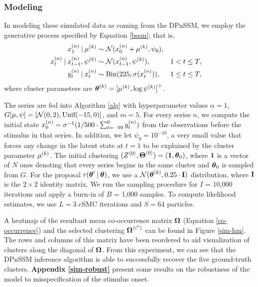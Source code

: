 \documentclass[twoside]{article}
\begin{document}
\subsubsection{Modeling} \label{sim-model-details}
In modeling these simulated data as coming from the DPnSSM, we employ the generative process specified by Equation \ref{bssm}; that is,
\begin{align} \label{sim-model}
\idx[1] x n \given \idx \mu k &\sim \Norm(\idx[0] x n + \idx \mu k, \psi_0),  \\ \nonumber
\idx[t] x n \given \idx[t-1] x n, \idx \psi k &\sim \Norm(\idx[t-1] x n, \idx \psi k), & & 1 < t \leq T, \\ \nonumber
\idx[t] y n \given \idx[t] x n &\sim \text{Bin}(225, \sigma(\idx[t] x n)), & & 1 \leq t \leq T, 
\end{align} 
where cluster parameters are $\bidx \theta k = [\idx \mu k, \log \idx \psi k]^\top$.  
 
The series are fed into Algorithm \ref{alg} with hyperparameter values $\alpha = 1$, $G[\mu, \psi] = [\Norm(0, 2), \text{Unif}(-15, 0)]$, and $m = 5$.  For every series $n$, we compute the initial state $\idx[0] x n = \sigma^{-1}(1 / 500 \cdot \sum_{t=-99}^{0} \idx[t] y n)$ from the observations before the stimulus in that series.  In addition, we let $\psi_0 = 10^{-10}$, a very small value that forces any change in the latent state at $t = 1$ to be explained by the cluster parameter $\idx \mu k$.  The initial clustering $(\aidx Z 0, \baidx \Theta 0) = (\bd 1, \bd \theta_0)$, where $\bd 1$ is a vector of $N$ ones denoting that every series begins in the same cluster and $\bd \theta_0$ is sampled from $G$.  For the proposal $r(\bd \theta' \given \bd \theta)$, we use a $\Norm(\bidx \theta k,  0.25 \cdot {\bold I})$ distribution, where $\bold I$ is the $2 \times 2$ identity matrix.  We run the sampling procedure for $I$ = 10,000 iterations and apply a burn-in of $B$ = 1,000 samples. To compute likelihood estimates, we use $L = 3$ cSMC iterations and $S = 64$ particles.  

A heatmap of the resultant mean co-occurrence matrix $\bd \Omega$ (Equation \ref{co-occurrence}) and the selected clustering $\baidx \Omega {i^*}$ can be found in Figure \ref{sim-hm}.  The rows and columns of this matrix have been reordered to aid visualization of clusters along the diagonal of $\bd \Omega$.  From this experiment, we can see that the DPnSSM inference algorithm is able to successfully recover the five ground-truth clusters.  \textbf{Appendix \ref{sim-robust}} present some results on the robustness of the model to misspecification of the stimulus onset.     
\end{document}
